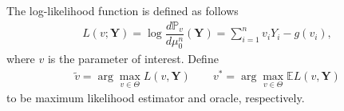 \documentclass[12pt]{article}
\renewcommand{\=}[1]{\stackrel{#1}{=}} %
\begin{document}
\par The log-likelihood function is defined as follows 
\begin{align}\label{real}
L(v; \mathbf{Y}) = \log \dfrac {d \mathbb{P}_{v}}{d\mu_0^n}(\mathbf{Y}) = \sum_{i=1}^n v_i Y_i - g(v_i),
\end{align}
where $v$ is the parameter of interest. Define 
\begin{align}
\tilde{v} = \arg\max_{v \in \Theta} L(v, \mathbf{Y}) \qquad v^* = \arg\max_{v \in \Theta} \mathbb{E} L(v, \mathbf{Y}) 
\end{align}
to be maximum likelihood estimator and oracle, respectively. 
\end{document}
